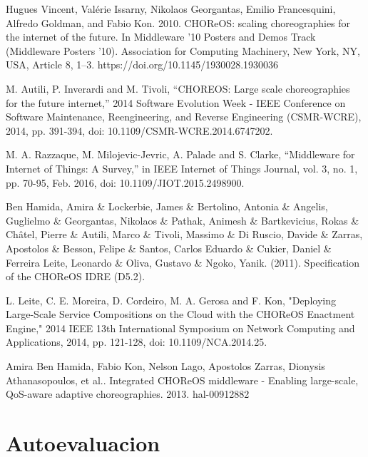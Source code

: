 \documentclass[runningheads]{llncs}
\begin{document}
%
%
%
% 
% 
%
\begin{thebibliography}{8}
Hugues Vincent, Valérie Issarny, Nikolaos Georgantas, Emilio Francesquini, Alfredo Goldman, and Fabio Kon. 2010. CHOReOS: scaling choreographies for the internet of the future. In Middleware '10 Posters and Demos Track (Middleware Posters '10). Association for Computing Machinery, New York, NY, USA, Article 8, 1–3. https://doi.org/10.1145/1930028.1930036

M. Autili, P. Inverardi and M. Tivoli, ``CHOREOS: Large scale choreographies for the future internet,'' 2014 Software Evolution Week - IEEE Conference on Software Maintenance, Reengineering, and Reverse Engineering (CSMR-WCRE), 2014, pp. 391-394, doi: 10.1109/CSMR-WCRE.2014.6747202.

M. A. Razzaque, M. Milojevic-Jevric, A. Palade and S. Clarke, ``Middleware for Internet of Things: A Survey,'' in IEEE Internet of Things Journal, vol. 3, no. 1, pp. 70-95, Feb. 2016, doi: 10.1109/JIOT.2015.2498900.

Ben Hamida, Amira \& Lockerbie, James \& Bertolino, Antonia \& Angelis, Guglielmo \& Georgantas, Nikolaos \& Pathak, Animesh \& Bartkevicius, Rokas \& Châtel, Pierre \& Autili, Marco \& Tivoli, Massimo \& Di Ruscio, Davide \& Zarras, Apostolos \& Besson, Felipe \& Santos, Carlos Eduardo \& Cukier, Daniel \& Ferreira Leite, Leonardo \& Oliva, Gustavo \& Ngoko, Yanik. (2011). Specification of the CHOReOS IDRE (D5.2). 

L. Leite, C. E. Moreira, D. Cordeiro, M. A. Gerosa and F. Kon, "Deploying Large-Scale Service Compositions on the Cloud with the CHOReOS Enactment Engine," 2014 IEEE 13th International Symposium on Network Computing and Applications, 2014, pp. 121-128, doi: 10.1109/NCA.2014.25.


Amira Ben Hamida, Fabio Kon, Nelson Lago, Apostolos Zarras, Dionysis Athanasopoulos, et al.. Integrated CHOReOS middleware - Enabling large-scale, QoS-aware adaptive choreographies. 2013. hal-00912882

\end{thebibliography}



\section{Autoevaluacion}
\end{document}
